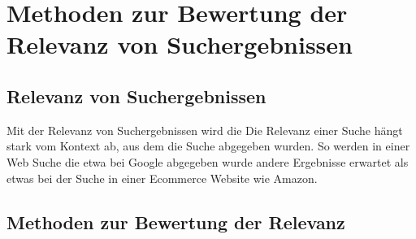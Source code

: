 \chapter{Methoden zur Bewertung der Relevanz von Suchergebnissen}
\label{ch:grundlagen}

\section{Relevanz von Suchergebnissen}
Mit der Relevanz von Suchergebnissen wird die
Die Relevanz einer Suche hängt stark vom Kontext ab, aus dem die Suche abgegeben wurden. So werden in einer Web Suche die etwa bei Google abgegeben wurde andere Ergebnisse erwartet als etwas bei der Suche in einer Ecommerce Website wie Amazon.


\section{Methoden zur Bewertung der Relevanz}
